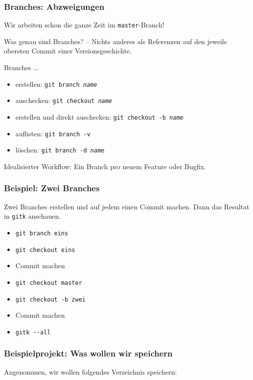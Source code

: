 \documentclass{beamer}
\begin{document}
\begin{frame}
\frametitle{Branches: Abzweigungen}



Wir arbeiten schon die ganze Zeit im \texttt{master}-Branch!

\vspace{.5cm}


Was genau sind Branches? -- Nichts anderes als Referenzen auf den jeweils
obersten Commit einer Versionsgeschichte.

\vspace{.5cm}


Branches ...
\begin{itemize}
	\item erstellen: \texttt{git branch \emph{name}}
	\item auschecken: \texttt{git checkout \emph{name}}
	\item erstellen und direkt auschecken: \texttt{git checkout -b \emph{name}}
	\item auflisten: \texttt{git branch -v}
	\item löschen: \texttt{git branch -d \emph{name}}
\end{itemize}


\vspace{.5cm}

Idealisierter Workflow: Ein Branch pro neuem Feature oder Bugfix.


\end{frame}
\begin{frame}
\frametitle{Beispiel: Zwei Branches}



Zwei Branches erstellen und auf jedem einen Commit machen. Dann das
Resultat in \texttt{gitk} anschauen.

\begin{itemize}
	\item \texttt{git branch eins}
	\item \texttt{git checkout eins}
	\item Commit machen
	\item \texttt{git checkout master}
	\item \texttt{git checkout -b zwei}
	\item Commit machen
	\item \texttt{gitk -{}-all}
\end{itemize}


\end{frame}
\begin{frame}
\frametitle{Beispielprojekt: Was wollen wir speichern}



Angenommen, wir wollen folgendes Verzeichnis speichern:


\vspace{0.5cm}




\end{frame}
\end{document}

